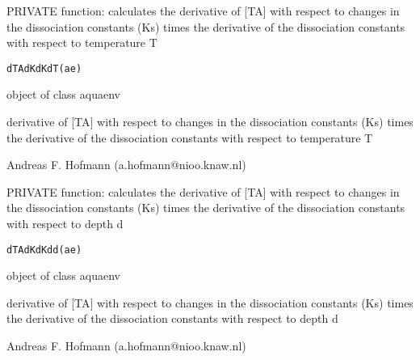 \documentclass{article}
\begin{document}
\begin{Description}\relax
PRIVATE function: calculates the derivative of [TA] with respect to changes in the dissociation constants (Ks) times the derivative of the dissociation constants with respect to temperature T
\end{Description}
\begin{Usage}
\begin{verbatim}dTAdKdKdT(ae)\end{verbatim}
\end{Usage}
\begin{Arguments}
\begin{ldescription}
\item[\code{ae }] object of class aquaenv
\end{ldescription}
\end{Arguments}
\begin{Value}
derivative of [TA] with respect to changes in the dissociation constants (Ks) times the derivative of the dissociation constants with respect to temperature T
\end{Value}
\begin{Author}\relax
Andreas F. Hofmann (a.hofmann@nioo.knaw.nl)
\end{Author}

\begin{Description}\relax
PRIVATE function: calculates the derivative of [TA] with respect to changes in the dissociation constants (Ks) times the derivative of the dissociation constants with respect to depth d
\end{Description}
\begin{Usage}
\begin{verbatim}dTAdKdKdd(ae)\end{verbatim}
\end{Usage}
\begin{Arguments}
\begin{ldescription}
\item[\code{ae }] object of class aquaenv
\end{ldescription}
\end{Arguments}
\begin{Value}
derivative of [TA] with respect to changes in the dissociation constants (Ks) times the derivative of the dissociation constants with respect to depth d
\end{Value}
\begin{Author}\relax
Andreas F. Hofmann (a.hofmann@nioo.knaw.nl)
\end{Author}
\end{document}
